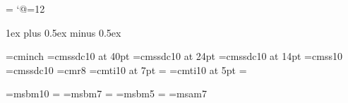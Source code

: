 \output={\normaloutput}
\newbox\partialpage \newdimen\origvsize \newif\ifrigid
\def\begindoublecolumns{\global\origvsize=\vsize \begingroup
  \output={\global\setbox\partialpage=\vbox{\unvbox255\kern0pt}}\eject
  \output={\doublecolumnout} \hsize=\colwidth \dimen@=\pageheight
  \advance\dimen@ by-\ht\partialpage \multiply\dimen@ by2
  \ifdim\dimen@<2\baselineskip \dimen@=2\baselineskip\fi
  \vsize=\dimen@}
\def\enddoublecolumns{\output={\balancecolumns}\eject
  \endgroup \global\vsize=\origvsize \pagegoal=\vsize}
\def\doublecolumnout{\splittopskip=\topskip \splitmaxdepth=\maxdepth
  \setbox0=\vsplit255 to.46\vsize \setbox2=\vsplit255 to.46\vsize
  \onepageout\pagesofar \global\vsize=2\pageheight
  \unvbox255 \penalty\outputpenalty}
\def\pagesofar{\unvbox\partialpage
  \wd0=\hsize \wd2=\hsize
  \hbox to\pagewidth{\valign{##\vfill\cr%
  \vbox{\unvbox0}\cr\noalign{\hfil\separator\hfil}\vbox{\unvbox2}\cr}}}
\def\norulesep{\let\separator=\relax}
\def\rulesep{\let\separator=\vrule}
\let\separator=\relax
\def\balancecolumns{\setbox0=\vbox{\unvbox255} \dimen@=\ht0
  \advance\dimen@ by\topskip \advance\dimen@ by-\baselineskip
  \divide\dimen@ by2 \splittopskip=\topskip
  {\vbadness=10000 \loop \global\setbox3=\copy0
    \global\setbox1=\vsplit3 to\dimen@
    \ifdim\ht3>\dimen@ \global\advance\dimen@ by1pt \repeat}
  \ifrigid
    \setbox0=\vtop{\unvbox1}
    \setbox2=\vtop{\unvbox3}
  \else
    \setbox0=\vbox to\dimen@{\unvbox1}
    \setbox2=\vbox to\dimen@{\dimen2=\dp3 \unvbox3\kern-\dimen2 \vfil}
  \fi
  \global\vsize=\origvsize \pagesofar}
\catcode`@=12

\colwidth 19pc
\newdimen\manindent      \manindent 3pc
\newdimen\smallmanindent \smallmanindent 1pc
\parskip 1ex plus 0.5ex minus 0.5ex
\parindent 0pt

\font\inchhigh=cminch
\font\titlefont=cmssdc10 at 40pt
\font\subtitlefont=cmssdc10 at 24pt
\font\secfont=cmssdc10 at 14pt
\font\sf=cmss10
\font\bsf=cmssdc10
\font\smallrom=cmr8
\font\sevenit=cmti10 at 7pt \scriptfont\itfam=\sevenit
\font\fiveit=cmti10 at 5pt  \scriptscriptfont\itfam=\fiveit

\newfam\msbfam \def\Bbb{\fam\msbfam}
\font\tenmsb=msbm10         \textfont\msbfam=\tenmsb
\font\sevenmsb=msbm7        \scriptfont\msbfam=\sevenmsb
\font\fivemsb=msbm5         \scriptscriptfont\msbfam=\fivemsb
\font\sevenmsa=msam7

